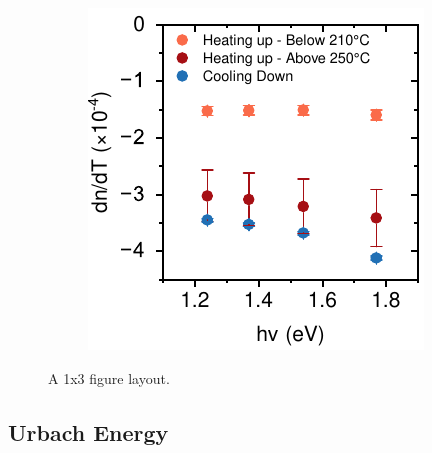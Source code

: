 \begin{figure}[htbp]
\begin{subfigure}{0.32\textwidth}
        \caption{}
        \label{fig:ellipsometry:thermooptic_cooling}
    \end{subfigure}
    \hfill
    \begin{subfigure}{0.3\textwidth}
        \includegraphics[width=\textwidth]{chapters/ellipsometry/image/Thermo-optic_Coefficient_energy.pdf}
        \caption{}
        \label{fig:ellipsometry:thermooptic_energy}
    \end{subfigure}
    \caption{A 1x3 figure layout.}
    \label{fig:ellipsometry:thermooptic}
\end{figure}



\subsection{Urbach Energy}


